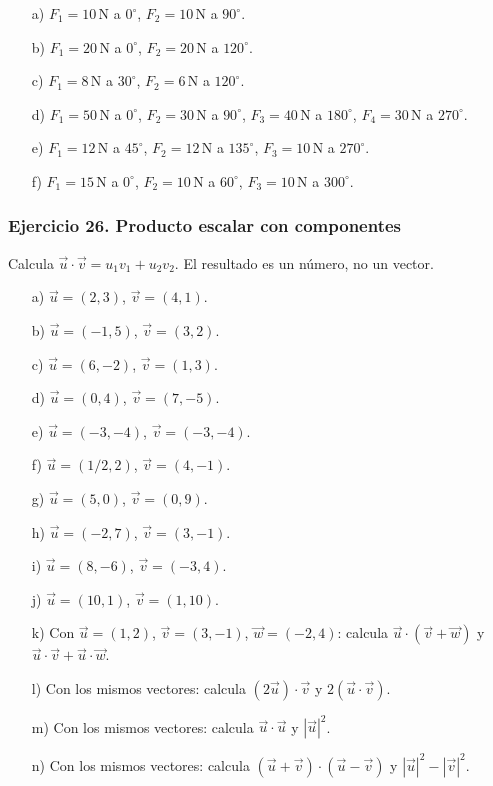 \begin{enumerate}
    \item[a)] $F_1=10\,\mathrm{N}$ a $0^\circ$,
    $F_2=10\,\mathrm{N}$ a $90^\circ$.

    \item[b)] $F_1=20\,\mathrm{N}$ a $0^\circ$,
    $F_2=20\,\mathrm{N}$ a $120^\circ$.

    \item[c)] $F_1=8\,\mathrm{N}$ a $30^\circ$,
    $F_2=6\,\mathrm{N}$ a $120^\circ$.

    \item[d)] $F_1=50\,\mathrm{N}$ a $0^\circ$,
    $F_2=30\,\mathrm{N}$ a $90^\circ$,
    $F_3=40\,\mathrm{N}$ a $180^\circ$,
    $F_4=30\,\mathrm{N}$ a $270^\circ$.

    \item[e)] $F_1=12\,\mathrm{N}$ a $45^\circ$,
    $F_2=12\,\mathrm{N}$ a $135^\circ$,
    $F_3=10\,\mathrm{N}$ a $270^\circ$.

    \item[f)] $F_1=15\,\mathrm{N}$ a $0^\circ$,
    $F_2=10\,\mathrm{N}$ a $60^\circ$,
    $F_3=10\,\mathrm{N}$ a $300^\circ$.
\end{enumerate}

\subsubsection*{Ejercicio 26. Producto escalar con componentes}

Calcula $\vec{u}\cdot\vec{v}=u_1v_1+u_2v_2$. El resultado es un número, no un vector.

\begin{enumerate}
    \item[a)] $\vec{u}=(2,3)$, $\vec{v}=(4,1)$.
    \item[b)] $\vec{u}=(-1,5)$, $\vec{v}=(3,2)$.
    \item[c)] $\vec{u}=(6,-2)$, $\vec{v}=(1,3)$.
    \item[d)] $\vec{u}=(0,4)$, $\vec{v}=(7,-5)$.
    \item[e)] $\vec{u}=(-3,-4)$, $\vec{v}=(-3,-4)$.
    \item[f)] $\vec{u}=(1/2,2)$, $\vec{v}=(4,-1)$.
    \item[g)] $\vec{u}=(5,0)$, $\vec{v}=(0,9)$.
    \item[h)] $\vec{u}=(-2,7)$, $\vec{v}=(3,-1)$.
    \item[i)] $\vec{u}=(8,-6)$, $\vec{v}=(-3,4)$.
    \item[j)] $\vec{u}=(10,1)$, $\vec{v}=(1,10)$.
    \item[k)] Con $\vec{u}=(1,2)$, $\vec{v}=(3,-1)$,
    $\vec{w}=(-2,4)$: calcula
    $\vec{u}\cdot(\vec{v}+\vec{w})$ y
    $\vec{u}\cdot\vec{v}+\vec{u}\cdot\vec{w}$.
    \item[l)] Con los mismos vectores: calcula
    $(2\vec{u})\cdot\vec{v}$ y $2(\vec{u}\cdot\vec{v})$.
    \item[m)] Con los mismos vectores: calcula
    $\vec{u}\cdot\vec{u}$ y $|\vec{u}|^2$.
    \item[n)] Con los mismos vectores: calcula
    $(\vec{u}+\vec{v})\cdot(\vec{u}-\vec{v})$ y
    $|\vec{u}|^2-|\vec{v}|^2$.
\end{enumerate}

